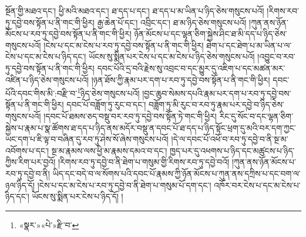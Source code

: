 སྔོན་གྱི་མཐའ་དང་། ཕྱི་མའི་མཐའ་དང་། ཐ་དད་པ་དང་། ཐ་དད་པ་མ་ཡིན་པ་ཉིད་ཅེས་གསུངས་པའོ། །རིགས་རབ་ཏུ་དབྱེ་བས་སྟོན་པ་ནི་གང་གི་ཕྱིར། རྒྱ་ཆེན་པོ་དང་། འབྲིང་དང་། ཐ་མ་ཉིད་ཅེས་གསུངས་པའོ། །ཀུན་ནས་ཉོན་མོངས་པ་རབ་ཏུ་དབྱེ་བས་སྟོན་པ་ནི་གང་གི་ཕྱིར། ཉོན་མོངས་པ་དང་ལྷན་ཅིག་སྐྱེས་ཤིང་ཐ་མི་དད་པ་ཉིད་ཅེས་གསུངས་པའོ། །ངེས་པ་དང་མ་ངེས་པ་རབ་ཏུ་དབྱེ་བས་སྟོན་པ་ནི་གང་གི་ཕྱིར། ཐེག་པ་དང་ཐེག་པ་མ་ཡིན་པ་ལ་ངེས་པ་དང་མ་ངེས་པ་ཉིད་དང་། ཡོངས་སུ་སྨིན་པར་ངེས་པ་དང་མ་ངེས་པ་ཉིད་ཅེས་གསུངས་པའོ། །འབྱུང་བ་རབ་ཏུ་དབྱེ་བས་སྟོན་པ་ནི་གང་གི་ཕྱིར། དབང་པོའི་དྲ་བའི་རྗེས་སུ་འབྲང་བ་དང་མྱུར་དུ་འཇིག་པ་དང་མཚན་མར་འཛིན་པ་ཉིད་ཅེས་གསུངས་པའོ། །ཉན་ཐོས་ཀྱི་རྣམ་པར་དག་པ་རབ་ཏུ་དབྱེ་བས་སྟོན་པ་ནི་གང་གི་ཕྱིར། དབང་པོའི་དབང་གིས་མི་:བརྫི་བ་\footnote{«སྣར་»«པེ་»རྫི་བ་}ཉིད་ཅེས་གསུངས་པའོ། །བྱང་ཆུབ་སེམས་དཔའི་རྣམ་པར་དག་པ་རབ་ཏུ་དབྱེ་བས་སྟོན་པ་ནི་གང་གི་ཕྱིར། དབང་པོ་བཟློག་ཏུ་རུང་བ་དང་། བཟློག་ཏུ་མི་རུང་བ་རབ་ཏུ་རྣམ་པར་དབྱེ་བ་ཉིད་ཅེས་གསུངས་པའོ། །དབང་པོ་ཐམས་ཅད་བསྡུ་བར་རབ་ཏུ་དབྱེ་བས་སྟོན་ཏེ་གང་གི་ཕྱིར། རིང་དུ་སོང་བ་དང་ལྷན་ཅིག་སྐྱེས་པ་རྣམ་པ་སྣ་ཚོགས་ཐ་དད་པ་ཉིད་ནས་མདོར་བསྡུ་ན་དབང་པོ་ཐ་དད་པ་ཉིད་སྟོང་ཕྲག་དུ་མའི་བར་དག་ཀྱང་ཡང་དག་པ་ཇི་ལྟ་བ་བཞིན་དུ་རབ་ཏུ་ཤེས་སོ་ཞེས་གསུངས་པའོ། །དེ་ལ་དབང་པོ་འཕོ་བ་རབ་ཏུ་དབྱེ་བ་ནི་སྔ་མ་འབོགས་པ་དང་། སྔ་མ་རྣམས་ལས་ཕྱི་མ་རྣམས་དམའ་བ་དང་། ཁྱད་པར་དུ་འཕགས་པ་ཉིད་དང་མཚུངས་པ་ཉིད་ཀྱིས་རིག་པར་བྱའོ། །རིགས་རབ་ཏུ་དབྱེ་བ་ནི་ཐེག་པ་གསུམ་གྱི་རིགས་རབ་ཏུ་དབྱེ་བའོ། །ཀུན་ནས་ཉོན་མོངས་པ་རབ་ཏུ་དབྱེ་བ་ནི། ཡིད་དང་བདེ་བ་ལ་སོགས་པའི་དབང་པོ་རྣམས་ཀྱི་ཉོན་མོངས་པ་ཀུན་ནས་དཀྲིས་པ་དང་བག་ལ་ཉལ་ཉིད་དོ། །ངེས་པ་དང་མ་ངེས་པ་རབ་ཏུ་དབྱེ་བ་ནི་ཐེག་པ་གསུམ་པོ་དག་དང་། འཁོར་བར་ངེས་པ་དང་མ་ངེས་པ་ཉིད་དང་། ཡོངས་སུ་སྨིན་པར་ངེས་པ་ཉིད་དོ། །
